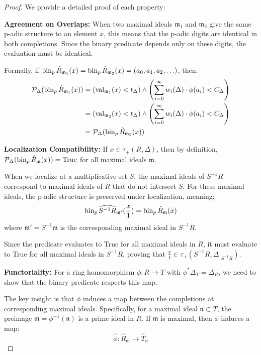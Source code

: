 \begin{proof}
We provide a detailed proof of each property:

\textbf{Agreement on Overlaps:} When two maximal ideals $\mathfrak{m}_1$ and $\mathfrak{m}_2$ give the same p-adic structure to an element $x$, this means that the p-adic digits are identical in both completions. Since the binary predicate depends only on these digits, the evaluation must be identical.

Formally, if $\operatorname{bin}_p{\hat{R}_{\mathfrak{m}_1}}(x) = \operatorname{bin}_p{\hat{R}_{\mathfrak{m}_2}}(x) = (a_0, a_1, a_2, \ldots)$, then:
\begin{align*}
\mathcal{P}_\Delta(\operatorname{bin}_p{\hat{R}_{\mathfrak{m}_1}}(x)) &= \left(\operatorname{val}_{\mathfrak{m}_1}(x) < t_\Delta\right) \wedge \left(\sum_{i=0}^{\infty} w_i(\Delta) \cdot \phi(a_i) < C_\Delta\right) \\
&= \left(\operatorname{val}_{\mathfrak{m}_2}(x) < t_\Delta\right) \wedge \left(\sum_{i=0}^{\infty} w_i(\Delta) \cdot \phi(a_i) < C_\Delta\right) \\
&= \mathcal{P}_\Delta(\operatorname{bin}_p{\hat{R}_{\mathfrak{m}_2}}(x))
\end{align*}

\textbf{Localization Compatibility:} If $x \in \tau_+(R, \Delta)$, then by definition, $\mathcal{P}_\Delta(\operatorname{bin}_p{\hat{R}_{\mathfrak{m}}}(x)) = \text{True}$ for all maximal ideals $\mathfrak{m}$.

When we localize at a multiplicative set $S$, the maximal ideals of $S^{-1}R$ correspond to maximal ideals of $R$ that do not intersect $S$. For these maximal ideals, the p-adic structure is preserved under localization, meaning:
$$\operatorname{bin}_p{\widehat{S^{-1}R}_{\mathfrak{m'}}}(\frac{x}{1}) = \operatorname{bin}_p{\hat{R}_{\mathfrak{m}}}(x)$$
where $\mathfrak{m'} = S^{-1}\mathfrak{m}$ is the corresponding maximal ideal in $S^{-1}R$.

Since the predicate evaluates to True for all maximal ideals in $R$, it must evaluate to True for all maximal ideals in $S^{-1}R$, proving that $\frac{x}{1} \in \tau_+(S^{-1}R, \Delta|_{S^{-1}R})$.

\textbf{Functoriality:} For a ring homomorphism $\phi: R \to T$ with $\phi^*\Delta_T = \Delta_R$, we need to show that the binary predicate respects this map.

The key insight is that $\phi$ induces a map between the completions at corresponding maximal ideals. Specifically, for a maximal ideal $\mathfrak{n} \subset T$, the preimage $\mathfrak{m} = \phi^{-1}(\mathfrak{n})$ is a prime ideal in $R$. If $\mathfrak{m}$ is maximal, then $\phi$ induces a map:
$$\hat{\phi}: \hat{R}_{\mathfrak{m}} \to \hat{T}_{\mathfrak{n}}$$


\end{proof}
